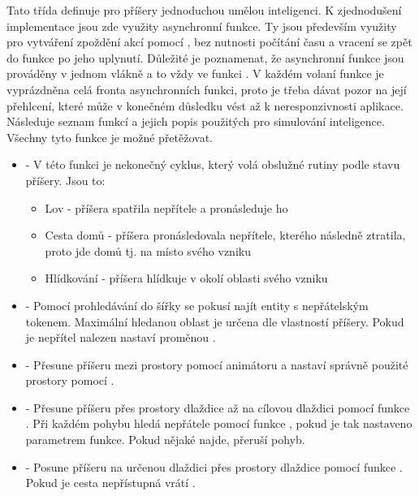 Tato třída definuje pro příšery jednoduchou umělou inteligenci. K zjednodušení implementace jsou zde využity 
asynchronní funkce. Ty jsou především využity pro vytváření zpoždění akcí pomocí , bez nutnosti počítání času a vracení se zpět
do funkce po jeho uplynutí. Důležité je poznamenat, že asynchronní funkce jsou prováděny v jednom vlákně a to vždy ve funkci . V každém volaní funkce
je vyprázdněna celá fronta asynchronních funkci, proto je třeba dávat pozor na její přehlcení, které může v konečném důsledku vést až k neresponzivnosti aplikace.
Následuje seznam funkcí a jejich popis použitých pro simulování inteligence. Všechny tyto funkce je možné přetěžovat.
\begin{itemize}

\item {} - V této funkci je nekonečný cyklus, který volá obslužné rutiny podle stavu příšery. Jsou to:
	\begin{itemize}
    \item Lov - příšera spatřila nepřítele a pronásleduje ho 
    \item Cesta domů - příšera pronásledovala nepřítele, kterého následně ztratila, proto jde domů tj. na místo svého vzniku
    \item Hlídkování - příšera hlídkuje v okolí oblasti svého vzniku
	\end{itemize}

\item {} - Pomocí prohledávání do šířky se pokusí najít entity s nepřátelským tokenem. Maximální hledanou oblast
je určena dle vlastností příšery. Pokud je nepřítel nalezen nastaví proměnou .

\item {} - Přesune příšeru mezi prostory pomocí animátoru a nastaví správně použité prostory pomocí .

\item {} - Přesune příšeru přes prostory dlaždice až na cílovou dlaždici pomocí funkce . Při každém pohybu hledá nepřátele
pomocí funkce , pokud je tak nastaveno parametrem funkce. Pokud nějaké najde, přeruší pohyb.

\item {} - Posune příšeru na určenou dlaždici přes prostory dlaždice pomocí funkce .
 Pokud je cesta nepřístupná vrátí .


\end{itemize}
